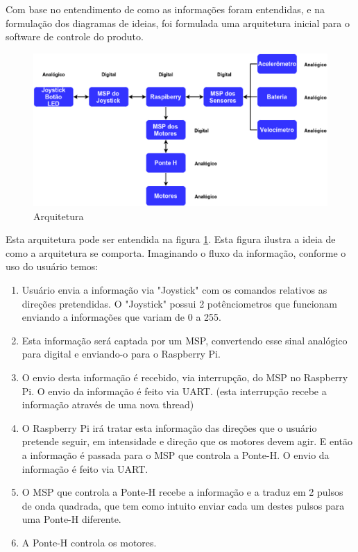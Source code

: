 Com base no entendimento de como as informações foram entendidas, e na formulação dos diagramas de ideias, foi formulada uma arquitetura inicial para o software de controle do produto.

\begin{figure}[!htb]
\centering
  \includegraphics[keepaspectratio=true,scale=0.6]{figuras/resultados/arquitetura}
\caption{Arquitetura}
\label{fig:arquitetura}
\end{figure}

Esta arquitetura pode ser entendida na figura \ref{fig:arquitetura}. Esta figura ilustra a ideia de como a arquitetura se comporta. Imaginando o fluxo da informação, conforme o uso do usuário temos:

\begin{enumerate}
  \item Usuário envia a informação via "Joystick" com os comandos relativos as direções pretendidas. O "Joystick" possui 2 potênciometros que funcionam enviando a informações que variam de 0 a 255.
  \item Esta informação será captada por um MSP, convertendo esse sinal analógico para digital e enviando-o para o Raspberry Pi.
  \item O envio desta informação é recebido, via interrupção, do MSP no Raspberry  Pi. O envio da informação é feito via UART. (esta interrupção recebe a informação através de uma nova thread)
  \item O Raspberry Pi irá tratar esta informação das direções que o usuário pretende seguir, em intensidade e direção que os motores devem agir. E então a informação é passada para o MSP que controla a Ponte-H. O envio da  informação é feito via UART.
  \item O MSP que controla a Ponte-H recebe a informação e a traduz em 2 pulsos de onda quadrada, que tem como intuito enviar cada um destes pulsos para uma Ponte-H diferente.
  \item A Ponte-H controla os motores.
\end{enumerate}

